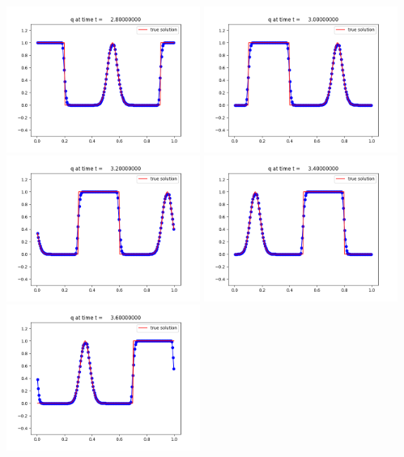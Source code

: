\documentclass[11pt]{article}
\begin{document}
\vskip 10pt 
\includegraphics[width=0.475\textwidth]{frame0014fig1.png}
\vskip 10pt 
\includegraphics[width=0.475\textwidth]{frame0015fig1.png}
\vskip 10pt 
\includegraphics[width=0.475\textwidth]{frame0016fig1.png}
\vskip 10pt 
\includegraphics[width=0.475\textwidth]{frame0017fig1.png}
\vskip 10pt 
\includegraphics[width=0.475\textwidth]{frame0018fig1.png}
\end{document}
